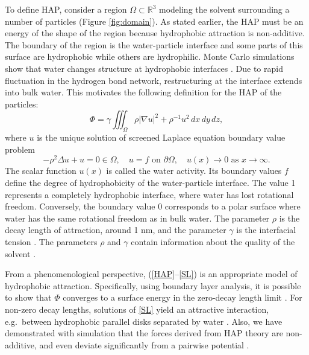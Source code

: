 To define HAP, consider a region $\Omega \subset \mathbb{R}^3$  
modeling the solvent surrounding a number of particles (Figure \ref{fig:domain}).
As stated earlier, the HAP must be an energy of the shape of the region
because hydrophobic attraction is non-additive. 
The boundary of the region is the water-particle interface and some parts of this
surface are hydrophobic while others are hydrophilic. 
Monte Carlo simulations 
show that water changes structure at hydrophobic interfaces \cite{Luzar1987, Jonsson2006,Varilly2011}.
Due to rapid fluctuation in the hydrogen bond network,
restructuring at the interface extends into bulk water.
This motivates the following definition for the HAP of the particles:
\begin{equation}
\label{HAP}
  \Phi = \gamma \iiint_{\Omega} \rho |\nabla u|^2 + \rho^{-1}u^2 \,dx \,dy \,dz, 
\end{equation}
where $u$ is the unique solution of screened Laplace equation boundary value problem 
\begin{equation}
  \label{SL}
  -\rho^2 \Delta u + u = 0 \in \Omega,\quad u = f  \mbox{ on } \partial \Omega, \quad u(x) \to 0 \mbox{ as } x \to \infty.
\end{equation}
The scalar function $u(x)$ is called the water activity. Its boundary values $f$ 
define the degree of hydrophobicity of the water-particle interface. The value 
1 represents a completely hydrophobic interface, where water has lost rotational freedom. 
Conversely, the boundary value 0 corresponds to a polar surface where water has the same rotational
freedom as in bulk water. The parameter $\rho$ is the decay length of attraction, 
around 1 nm, and the parameter $\gamma$ is the interfacial tension \cite{Israelachvili1954}.
The parameters $\rho$ and $\gamma$ contain information about the quality
of the solvent \cite{Discher2002}.

From a phenomenological perspective, (\ref{HAP}--\ref{SL}) 
is an appropriate model of hydrophobic attraction. Specifically,
using boundary layer analysis, it is possible 
to show that $\Phi$ converges to a surface energy in the zero-decay length limit \cite{Lee2018,Lin2015,Shibata2004}.
For non-zero decay lengths, solutions of \eqref{SL} yield an attractive interaction, e.g.~between hydrophobic parallel disks
separated by water \cite{Eriksson1989}. Also, we have demonstrated with simulation that the forces 
derived from HAP theory are non-additive, and even deviate significantly from 
a pairwise potential \cite{Meyer2006,Fu2018_SIAM}. 


